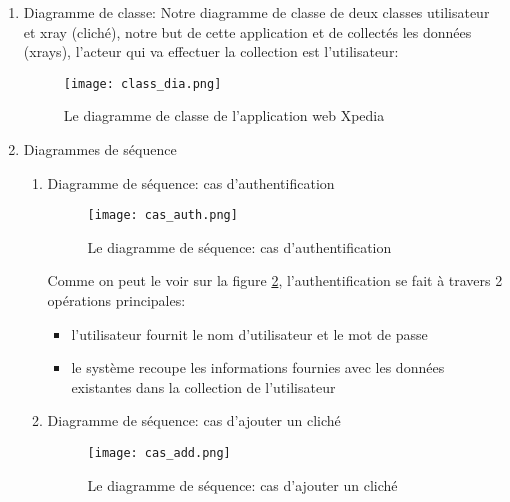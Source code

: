             \begin{enumerate}
                \item Diagramme de classe:
                Notre diagramme de classe de  deux classes utilisateur et xray (cliché), notre but de cette application et de collectés les données (xrays), l'acteur qui va effectuer la collection est l'utilisateur:
                \begin{figure}[H]
                    \centering
                    \texttt{[image: class\_dia.png]}
                    \caption{Le diagramme de classe de l'application web Xpedia}\label{fig:class_dia}
                \end{figure}
                \item Diagrammes de séquence
                \begin{enumerate}
                    \item Diagramme de séquence: cas d'authentification
                    \begin{figure}[H]
                        \centering
                        \texttt{[image: cas\_auth.png]}
                        \caption{Le diagramme de séquence: cas d'authentification}\label{fig:cas_auth}
                    \end{figure}

                    Comme on peut le voir sur la figure \ref{fig:cas_auth}, l'authentification se fait à travers 2 opérations principales:
                    \begin{itemize}[label=$\bullet$]
                        \item l'utilisateur fournit le nom d'utilisateur et le mot de passe
                        \item le système recoupe les informations fournies avec les données existantes dans la collection de l'utilisateur
                    \end{itemize}
                    \item Diagramme de séquence: cas d'ajouter un cliché
                    \begin{figure}[H]
                        \centering
                        \texttt{[image: cas\_add.png]}
                        \caption{Le diagramme de séquence: cas d'ajouter un cliché}\label{fig:cas_add}
                    \end{figure}
                \end{enumerate}
            \end{enumerate}
        

